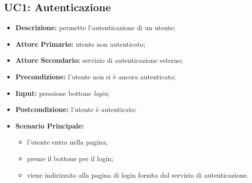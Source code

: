 \subsection{UC1: Autenticazione}
\label{sec:UC1}
\begin{itemize}
    \item \textbf{Descrizione:} permette l'autenticazione di un utente;
    \item \textbf{Attore Primario:} utente non autenticato;
    \item \textbf{Attore Secondario:} servizio di autenticazione esterno;
    \item \textbf{Precondizione:} l'utente non si è ancora autenticato;
    \item \textbf{Input:} pressione bottone \textit{login};
    \item \textbf{Postcondizione:} l'utente è autenticato;
    \item \textbf{Scenario Principale:}
          \begin{itemize}
              \item l'utente entra nella pagina;
              \item preme il bottone per il login;
              \item viene indirizzato alla pagina di login fornita dal servizio di autenticazione.
          \end{itemize}
\end{itemize}
\newpage